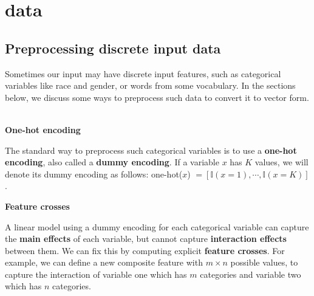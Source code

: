 \section{data}
\subsection{Preprocessing discrete input data}
Sometimes our input may have discrete input features, such as categorical variables like race and gender, or words from some vocabulary. In the sections below, we discuss some ways to preprocess such data to convert it to vector form. 
~\\
\par
\noindent
\textbf{One-hot encoding}
\par
The standard way to preprocess such categorical variables is to use a \textbf{one-hot encoding}, also called a \textbf{dummy encoding}. If a variable $x$ has $K$ values, we will denote its dummy encoding as follows: one-hot($x$) $=[\mathbb{I}(x=1), \cdots, \mathbb{I}(x=K)]$.
~\\
\par
\noindent
\textbf{Feature crosses}
\par
A linear model using a dummy encoding for each categorical variable can capture the \textbf{main effects} of each variable, but cannot capture \textbf{interaction effects} between them. We can fix this by computing explicit \textbf{feature crosses}. For example, we can define a new composite feature with $m\times n$ possible values, to capture the interaction of variable one which has $m$ categories and variable two which has $n$ categories.
